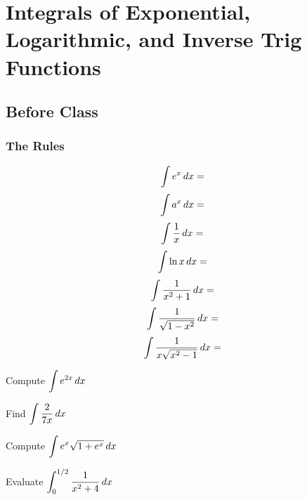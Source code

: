 \documentclass[notes]{subfiles}
\begin{document}
	\fancyhead[LO,RE]{\bfseries \currentname}
	\fancyfoot[C]{{}}
	\fancyfoot[RO,LE]{\large \thepage}	%
	
\section*{Integrals of Exponential, Logarithmic, and Inverse Trig Functions}\label{cs56}
	\subsection*{Before Class}
	\subsubsection*{The Rules}
		\begin{rmk}
			\[\displaystyle \int e^x\, dx = \]
				\vspace*{.2in}
			\[\displaystyle \int a^x\, dx = \]
				\vspace*{.2in}
			\[\displaystyle \int \dfrac{1}{x}\, dx = \]
				\vspace*{.2in}
			\[\displaystyle \int \ln x\, dx = \]
				\vspace*{.2in}
			\[\displaystyle \int \dfrac{1}{x^2 + 1}\, dx = \]
				\vspace*{.2in}
			\[\displaystyle \int \dfrac{1}{\sqrt{1-x^2}}\, dx = \]
				\vspace*{.2in}
			\[\displaystyle \int \dfrac{1}{x\sqrt{x^2-1}}\, dx = \]
				\vspace*{.2in}
		\end{rmk}
		
		\begin{ex}
			Compute \(\displaystyle \int e^{2x}\, dx\)
		\end{ex}
			\newpage
			
		\begin{ex}
			Find \(\displaystyle \int \dfrac{2}{7x}\, dx\)
		\end{ex}
			
		\begin{ex}
			Compute \(\displaystyle \int e^x\sqrt{1+e^x}\, dx\)
		\end{ex}
		
		\begin{ex}
			Evaluate \(\displaystyle \int_0^{1/2} \dfrac{1}{x^2 + 4}\, dx\)
		\end{ex}	
			\newpage
			
\end{document}
